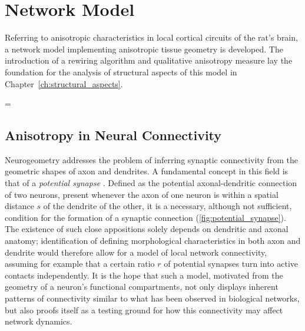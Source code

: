 \chapter{Network Model}\label{ch:Network Model} 

Referring to anisotropic characteristics in local cortical circuits of
the rat's brain, a network model implementing anisotropic tissue
geometry is developed. The introduction of a rewiring algorithm and
qualitative anisotropy measure %
lay the foundation for the analysis of structural aspects of this
model in Chapter~\ref{ch:structural_aspects}.

\parskip = \baselineskip %
\setlength{\parindent}{0pt}

\clearpage
\section{Anisotropy in Neural Connectivity}\label{sec:biol_anisotropy}







Neurogeometry addresses the problem of inferring
synaptic connectivity from the geometric shapes of axon and
dendrites. A fundamental concept in this field is that of a
\textit{potential synapse}
\parencite{Stepanyants2002}. Defined as the potential axonal-dendritic
connection of two neurons, present whenever the axon of one neuron is
within a spatial distance $s$ of the dendrite of the other, it is a
necessary, although not sufficient, condition for the formation of a
synaptic connection (\autoref{fig:potential_synapse}). The existence
of such close appositions solely depends on dendritic and axonal
anatomy; identification of defining morphological characteristics in
both axon and dendrite would therefore allow for a model of local
network connectivity, assuming for example that a certain ratio $r$ of
potential synapses turn into active contacts independently. It is the
hope that such a model, motivated from the geometry of a neuron's
functional compartments, not only displays inherent patterns of
connectivity similar to what has been observed in biological networks,
but also proofs itself as a testing ground for how this connectivity
may affect network dynamics.

